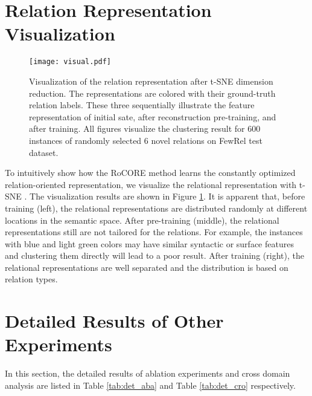 \documentclass[11pt]{article}
\begin{document}
    \section{Relation Representation Visualization}
    \label{app:visual}
    \begin{figure}[]
        \centering \texttt{[image: visual.pdf]}
        \caption{Visualization of the relation representation after t-SNE dimension reduction. The representations are colored with their ground-truth relation labels.
        These three sequentially illustrate the feature representation of initial sate, after reconstruction pre-training, and after training. All figures visualize the clustering result for 600 instances of randomly selected 6 novel relations on FewRel test dataset.}
        \label{fig:visual}
    \end{figure}   
    To intuitively show how the RoCORE method learns the constantly optimized relation-oriented representation, we visualize the relational representation with t-SNE \citep{JMLR:v9:vandermaaten08a}. The visualization results are shown in Figure \ref{fig:visual}. It is apparent that, before training (left), the relational representations are distributed randomly  at different locations in the semantic space. After pre-training (middle), the relational representations still are not tailored for the relations. For example, the instances with blue and light green colors may have similar syntactic or surface features and clustering them directly will lead to a poor result. After training (right), the relational representations are well separated and the 
   distribution is based on relation types. 
   \section{Detailed Results of Other Experiments}
   \label{app:other}
   In this section, the detailed results of ablation experiments and cross domain analysis are listed in Table \ref{tab:det_aba} and Table \ref{tab:det_cro} respectively.
        
\end{document}
